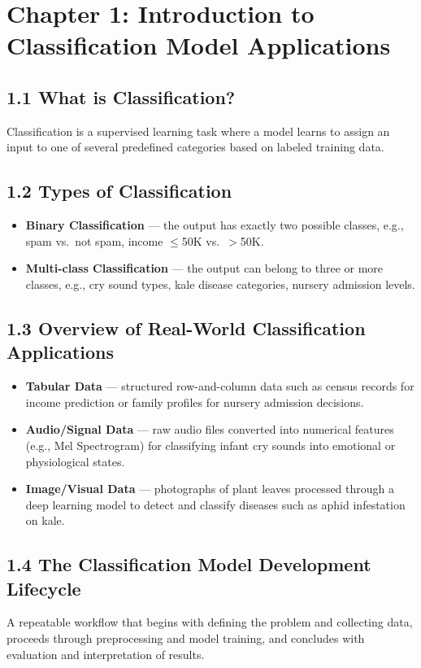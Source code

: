 \documentclass[12pt, a4paper]{article}
\begin{document}
\section*{Chapter 1: Introduction to Classification Model Applications}

\subsection*{1.1 What is Classification?}
Classification is a supervised learning task where a model learns to assign an input to one of several predefined categories based on labeled training data.

\subsection*{1.2 Types of Classification}
\begin{itemize}
    \item \textbf{Binary Classification} --- the output has exactly two possible classes, e.g., spam vs.\ not spam, income $\leq$50K vs.\ $>$50K.
    \item \textbf{Multi-class Classification} --- the output can belong to three or more classes, e.g., cry sound types, kale disease categories, nursery admission levels.
\end{itemize}

\subsection*{1.3 Overview of Real-World Classification Applications}
\begin{itemize}
    \item \textbf{Tabular Data} --- structured row-and-column data such as census records for income prediction or family profiles for nursery admission decisions.
    \item \textbf{Audio/Signal Data} --- raw audio files converted into numerical features (e.g., Mel Spectrogram) for classifying infant cry sounds into emotional or physiological states.
    \item \textbf{Image/Visual Data} --- photographs of plant leaves processed through a deep learning model to detect and classify diseases such as aphid infestation on kale.
\end{itemize}

\subsection*{1.4 The Classification Model Development Lifecycle}
A repeatable workflow that begins with defining the problem and collecting data, proceeds through preprocessing and model training, and concludes with evaluation and interpretation of results.
\end{document}
